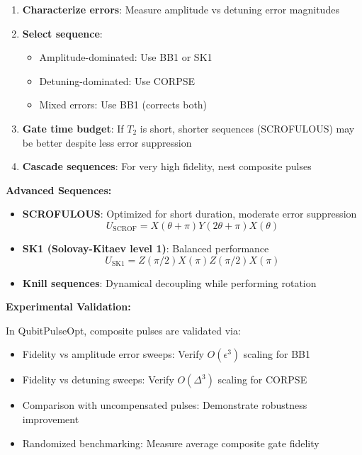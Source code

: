 \documentclass[11pt,a4paper]{article}
\theoremstyle{definition}
\theoremstyle{remark}
\begin{document}
\begin{enumerate}
    \item \textbf{Characterize errors}: Measure amplitude vs detuning error magnitudes
    \item \textbf{Select sequence}:
    \begin{itemize}
        \item Amplitude-dominated: Use BB1 or SK1
        \item Detuning-dominated: Use CORPSE
        \item Mixed errors: Use BB1 (corrects both)
    \end{itemize}
    \item \textbf{Gate time budget}: If $T_2$ is short, shorter sequences (SCROFULOUS) may be better despite less error suppression
    \item \textbf{Cascade sequences}: For very high fidelity, nest composite pulses
\end{enumerate}

\textbf{Advanced Sequences:}

\begin{itemize}
    \item \textbf{SCROFULOUS}: Optimized for short duration, moderate error suppression
    \begin{equation}
    U_{\text{SCROF}} = X(\theta+\pi) Y(2\theta+\pi) X(\theta)
    \end{equation}

    \item \textbf{SK1 (Solovay-Kitaev level 1)}: Balanced performance
    \begin{equation}
    U_{\text{SK1}} = Z(\pi/2) X(\pi) Z(\pi/2) X(\pi)
    \end{equation}

    \item \textbf{Knill sequences}: Dynamical decoupling while performing rotation
\end{itemize}

\textbf{Experimental Validation:}

In QubitPulseOpt, composite pulses are validated via:
\begin{itemize}
    \item Fidelity vs amplitude error sweeps: Verify $O(\epsilon^3)$ scaling for BB1
    \item Fidelity vs detuning sweeps: Verify $O(\Delta^3)$ scaling for CORPSE
    \item Comparison with uncompensated pulses: Demonstrate robustness improvement
    \item Randomized benchmarking: Measure average composite gate fidelity
\end{itemize}
\end{document}
